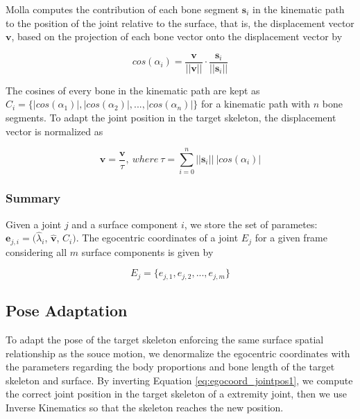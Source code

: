 \documentclass{vgtc}
\begin{document}
Molla computes the contribution of each bone segment \(\mathbf{s}_i\) in
the kinematic path to the position of the joint relative to the surface,
that is, the displacement vector \(\mathbf{v}\), based on the projection
of each bone vector onto the displacement vector by

\begin{equation}
\label{eq:contribution}
cos(\alpha_{i}) = \frac{\mathbf{v}}{||\mathbf{v}||}\cdot\frac{\mathbf{s}_{i}}{||\mathbf{s}_{i}||}
\end{equation}

The cosines of every bone in the kinematic path are kept as
\(C_{i} = \{|cos(\alpha_{1})|, |cos(\alpha_{2})|,..., |cos(\alpha_{n})|\}\)
for a kinematic path with \(n\) bone segments. To adapt the joint
position in the target skeleton, the displacement vector is normalized
as

\begin{equation}
\label{eq:tau}
\mathbf{\hat{v}} = \frac{\mathbf{v}}{\tau},\ where\ \tau = \sum_{i=0}^{n}||\mathbf{s}_{i}||\ |cos(\alpha_{i})|
\end{equation}

\subsubsection{Summary}\label{summary}

Given a joint \(j\) and a surface component \(i\), we store the set of
parametes: \(\mathbf{e}_{j,i} = (\hat{\lambda}_{i}\),
\(\mathbf{\hat{v}}\), \(C_{i})\). The egocentric coordinates of a joint
\(E_{j}\) for a given frame considering all \(m\) surface components is
given by

\begin{equation}
\label{eq:egocoordsall}
E_{j} = \{e_{j,1}, e_{j,2},...,e_{j,m}\}
\end{equation}


    \subsection{Pose Adaptation}\label{pose-adaptation}

To adapt the pose of the target skeleton enforcing the same surface
spatial relationship as the souce motion, we denormalize the egocentric
coordinates with the parameters regarding the body proportions and bone
length of the target skeleton and surface. By inverting Equation
\ref{eq:egocoord_jointpos1}, we compute the correct joint position in
the target skeleton of a extremity joint, then we use Inverse Kinematics
so that the skeleton reaches the new position.
\end{document}
